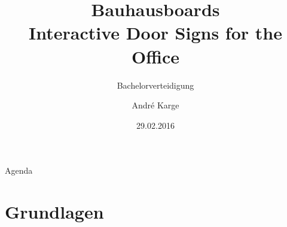 \documentclass[11pt]{beamer}
\title[Bauhausboards]{Bauhausboards\\Interactive Door Signs for the Office}
\subtitle{Bachelorverteidigung}
\author[André Karge]{André Karge}
\institute[Bauhaus-Universität Weimar]{\texttt{[image: buw-logo]}}
\date[29.02.2016]{29.02.2016}
\begin{document}

\maketitle

\begin{frame}{Agenda}
\tableofcontents
\end{frame}
\section{Grundlagen}
\end{document}
